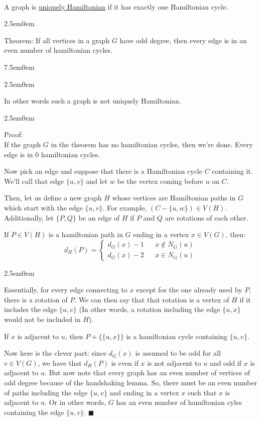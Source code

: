 \documentclass{book}
\newcommand{\hTwo}{%
   \color{MidnightBlue}%
   \fontsize{13}{15}\selectfont%
}
\newcommand{\hThree}{%
   \color{PineGreen}
   \fontsize{13}{15}\selectfont%
}
\newcommand{\hFour}{%
   \color{Cerulean}
   \fontsize{12}{14}\selectfont%
}
\newcommand{\teachComment}{
   \color{Orange}%
   \fontsize{12}{14}\selectfont%
}
\newenvironment{myIndent}{%
   \begin{adjustwidth}{2.5em}{0em}%
}{%
   \end{adjustwidth}%
}
\newenvironment{myTindent}{%
   \begin{adjustwidth}{7.5em}{0em}%
}{%
   \end{adjustwidth}%
}
\newcommand{\udefine}[1]{%
   \setulcolor{Red}%
   \setul{0.14em}{0.07em}%
   \ul{#1}%
}
\newcommand{\uuline}[2][.]{%
{\vphantom{a}\color{#1}%
\rlap{\rule[-0.18em]{\widthof{#2}}{0.06em}}%
\rlap{\rule[-0.32em]{\widthof{#2}}{0.06em}}}%
#2}
\newcommand{\mySepTwo}[1][.]{%
   {\noindent\color{#1}{\rule{6.5in}{0.5mm}}}\\%
}
\newcommand{\retTwo}{\hfill\bigbreak}
\begin{document}
\mySepTwo

A graph is \udefine{uniquely Hamiltonian} if it has exactly one Hamiltonian cycle. \retTwo

{\begin{myIndent} \hTwo
   \uuline{Theorem}: If all vertices in a graph $G$ have odd degree, then every edge is in an even number of hamiltonian cycles.
   
   {\begin{myTindent}\begin{myIndent} \teachComment
      In other words such a graph is not uniquely Hamiltonian. \retTwo
   \end{myIndent}\end{myTindent}}
   {\begin{myIndent} \hThree
      Proof: \\
      If the graph $G$ in the theorem has no hamiltonian cycles, then we're done. Every edge is in $0$ hamiltonian cycles. \retTwo

      Now pick an edge and suppose that there is a Hamiltonian cycle $C$ containing it. We'll call that edge $\{u, v\}$ and let $w$ be the vertex coming before $u$ on $C$. \retTwo
      
      Then, let us define a new graph $H$ whose vertices are Hamiltonian paths in $G$ which start with the edge $\{u, v\}$. For example, $(C - \{u, w\}) \in V(H)$. Additionally, let $\{P, Q\}$ be an edge of $H$ if $P$ and $Q$ are rotations of each other. \retTwo

      If $P \in V(H)$ is a hamiltonian path in $G$ ending in a vertex $x \in V(G)$, then: \[d_H(P) = \left\{\begin{matrix}
         d_G(x) - 1 & & x \notin N_G(u) \\
         d_G(x) - 2 & & x \in N_G(u)
      \end{matrix}\right.\]
      {\begin{myIndent} \hFour
         Essentially, for every edge connecting to $x$ except for the one already used by $P$, there is a rotation of $P$. We can then say that that rotation is a vertex of $H$ if it includes the edge $\{u, v\}$ (In other words, a rotation including the edge $\{u, x\}$ would not be included in $H$).
      \end{myIndent}}

      \retTwo
      If $x$ is adjacent to $u$, then $P + \{\{u, x\}\}$ is a hamiltonian cycle containing $\{u, v\}$. \retTwo

      Now here is the clever part: since $d_G(x)$ is assumed to be odd for all \\$v \in V(G)$, we have that $d_H(P)$ is even if $x$ is not adjacent to $u$ and odd if $x$ is adjacent to $u$. But now note that every graph has an even number of vertices of odd degree because of the handshaking lemma. So, there must be an even number of paths including the edge $\{u, v\}$ and ending in a vertex $x$ such that $x$ is adjacent to $u$. Or in other words, $G$ has an even number of hamiltonian cyles containing the edge $\{u, v\}$. $\blacksquare$
   \end{myIndent}}
\end{myIndent}} \retTwo
\end{document}
